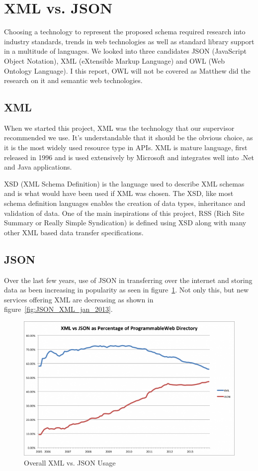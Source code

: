 \documentclass{article}
\begin{document}
\section{XML vs. JSON}
Choosing a technology to represent the proposed schema required research into industry standards, trends in web technologies as well as standard library support in a multitude of languages. We looked into three candidates JSON (JavaScript Object Notation), XML (eXtensible Markup Language) and OWL (Web Ontology Language). I this report, OWL will not be covered as Matthew did the research on it and semantic web technologies.

\subsection{XML}
When we started this project, XML was the technology that our supervisor recommended we use. It's understandable that it should be the obvious choice, as it is the most widely used resource type in APIs\cite{maleshkova2010investigating}. XML is mature language, first released in 1996 and is used extensively by Microsoft and integrates well into .Net and Java applications.

XSD (XML Schema Definition) is the language used to describe XML schemas and is what would have been used if XML was chosen. The XSD, like most schema definition languages enables the creation of data types, inheritance and validation of data. One of the main inspirations of this project, RSS (Rich Site Summary or Really Simple Syndication) is defined using XSD along with many other XML based data transfer specifications.

\subsection{JSON}
Over the last few years, use of JSON in transferring over the internet and storing data as been increasing in popularity as seen in figure~\ref{fig:JSON_XML_all_time}. Not only this, but new services offering XML are decreasing as shown in figure~\ref{fig:JSON_XML_jan_2013}.

\begin{figure}[h]
	\centering
	\includegraphics[scale=0.37]{images/xml_json_all_time.png}
	\caption{Overall XML vs. JSON Usage\protect\cite{duvander2013json}}
	\label{fig:JSON_XML_all_time}
\end{figure}
\end{document}
